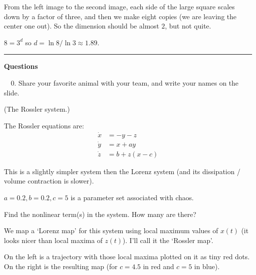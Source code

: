 \documentclass[12pt,letterpaper,noanswers]{exam}
\begin{document}
\vspace{0.1cm}

From the left image to the second image, each side of the large square scales down by a factor of three, and then we make eight copies (we are leaving the center one out).  So the dimension should be almost $2$, but not quite.

$8 = 3^d$ so $d = \ln 8/\ln 3 \approx 1.89$.

\vspace{0.2cm}

\hrule
\vspace{0.2cm}


\noindent\textbf{Questions}

\noindent \ \ 0.  Share your favorite animal with your team, and write your names on the slide.

\begin{questions}

\question (The Rossler system.)

The Rossler equations are:
\begin{align*}
\dot x &= -y-z \\
\dot y &= x + a y \\
\dot z &= b + z(x-c)
\end{align*}

This is a slightly simpler system then the Lorenz system (and its dissipation / volume contraction is slower).


$a = 0.2, b=0.2,c=5$ is a parameter set associated with chaos.

\begin{parts}
\item Find the nonlinear term(s) in the system.  How many are there?
\item We map a `Lorenz map' for this system using local maximum values of $x(t)$ (it looks nicer than local maxima of $z(t)$).  I'll call it the `Rossler map'.  

On the left is a trajectory with those local maxima plotted on it as tiny red dots. On the right is the resulting map (for $c = 4.5$ in red and $c=5$ in blue).


\end{parts}
\end{questions}
\end{document}
